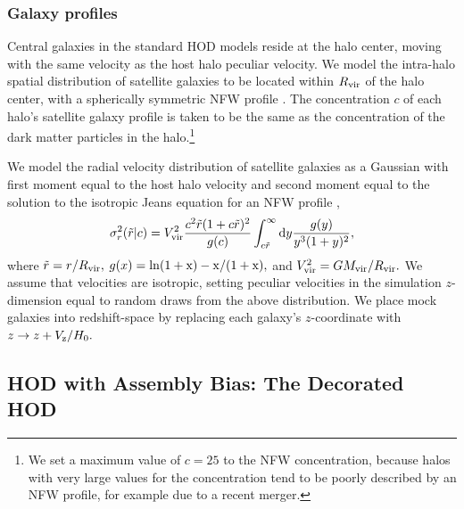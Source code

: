 \documentclass[usenatbib,usegraphicx,letterpaper]{mn2e}
\newcommand{\mvir}{M_{\rm vir}}
\newcommand{\rvir}{R_{\rm vir}}
\begin{document}
\subsubsection{Galaxy profiles}

Central galaxies in the standard HOD models reside at the halo center, 
moving with the same velocity as the host halo peculiar velocity. We model 
the intra-halo spatial distribution of satellite galaxies to be located within $\rvir$ 
of the halo center, with a spherically symmetric NFW profile \citep{nfw97}. 
The concentration $c$ of each halo's satellite galaxy profile is taken to be 
the same as the concentration of the dark matter particles in the 
halo.\footnote{We set a maximum value of $c=25$ to the NFW concentration, 
because halos with very large values for the concentration tend to be poorly 
described by an NFW profile, for example due to a recent merger.}


We model the radial velocity distribution of satellite galaxies as a Gaussian with 
first moment equal to the host halo velocity and second moment equal to the 
solution to the isotropic Jeans equation for an NFW profile \citep{more09b}, 
\begin{equation}
\sigma^{2}_{r}(\tilde{r}|c) = V_{\rm vir}^{2}\frac{c^{2}\tilde{r}(1 + c\tilde{r})^{2}}{g(c)}\int_{c\tilde{r}}^{\infty}{\rm d}y\frac{g(y)}{y^{3}(1 + y)^{2}}, 
\end{equation}
where $\tilde{r} = r/\rvir,$ $g(x) = \rm{ln}(1+x) - x / (1+x),$ and $V_{\rm vir}^{2} = G\mvir/\rvir.$ 
We assume that velocities are isotropic, setting peculiar velocities in the simulation $z$-dimension  
equal to random draws from the above distribution. We place mock galaxies 
into redshift-space by replacing each galaxy's $z$-coordinate with $z \rightarrow z + V_{\rm z}/H_0.$

\subsection{HOD with Assembly Bias: The Decorated HOD}
\label{subsection:decorated}
\end{document}
